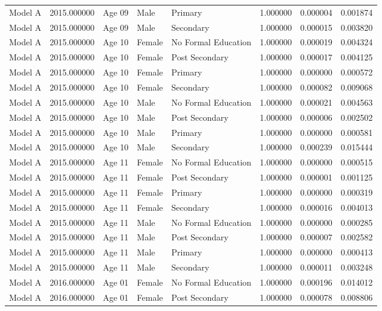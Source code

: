\begin{table}[ht]
\begin{tabular}{lrlllrrr}
Model A & 2015.000000 & Age 09 & Male & Primary & 1.000000 & 0.000004 & 0.001874 \\
Model A & 2015.000000 & Age 09 & Male & Secondary & 1.000000 & 0.000015 & 0.003820 \\
Model A & 2015.000000 & Age 10 & Female & No Formal Education & 1.000000 & 0.000019 & 0.004324 \\
Model A & 2015.000000 & Age 10 & Female & Post Secondary & 1.000000 & 0.000017 & 0.004125 \\
Model A & 2015.000000 & Age 10 & Female & Primary & 1.000000 & 0.000000 & 0.000572 \\
Model A & 2015.000000 & Age 10 & Female & Secondary & 1.000000 & 0.000082 & 0.009068 \\
Model A & 2015.000000 & Age 10 & Male & No Formal Education & 1.000000 & 0.000021 & 0.004563 \\
Model A & 2015.000000 & Age 10 & Male & Post Secondary & 1.000000 & 0.000006 & 0.002502 \\
Model A & 2015.000000 & Age 10 & Male & Primary & 1.000000 & 0.000000 & 0.000581 \\
Model A & 2015.000000 & Age 10 & Male & Secondary & 1.000000 & 0.000239 & 0.015444 \\
Model A & 2015.000000 & Age 11 & Female & No Formal Education & 1.000000 & 0.000000 & 0.000515 \\
Model A & 2015.000000 & Age 11 & Female & Post Secondary & 1.000000 & 0.000001 & 0.001125 \\
Model A & 2015.000000 & Age 11 & Female & Primary & 1.000000 & 0.000000 & 0.000319 \\
Model A & 2015.000000 & Age 11 & Female & Secondary & 1.000000 & 0.000016 & 0.004013 \\
Model A & 2015.000000 & Age 11 & Male & No Formal Education & 1.000000 & 0.000000 & 0.000285 \\
Model A & 2015.000000 & Age 11 & Male & Post Secondary & 1.000000 & 0.000007 & 0.002582 \\
Model A & 2015.000000 & Age 11 & Male & Primary & 1.000000 & 0.000000 & 0.000413 \\
Model A & 2015.000000 & Age 11 & Male & Secondary & 1.000000 & 0.000011 & 0.003248 \\
Model A & 2016.000000 & Age 01 & Female & No Formal Education & 1.000000 & 0.000196 & 0.014012 \\
Model A & 2016.000000 & Age 01 & Female & Post Secondary & 1.000000 & 0.000078 & 0.008806 \\

\end{tabular}
\end{table}
